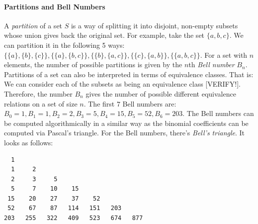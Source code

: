 




% 

\paragraph{Partitions and Bell Numbers}
\label{Sec:PartitionsOfSets}
A \emph{partition} of a set $S$ is a way of splitting it into disjoint, non-empty subsets whose union gives back the original set. For example, take the set $\{a,b,c\}$. We can partition it in the following 5 ways: $\{\{a\},\{b\},\{c\}\}, \{\{a\},\{b,c\}\}, \{\{b\},\{a,c\}\}, \{\{c\},\{a,b\}\}, \{\{a,b,c\}\}$. For a set with $n$ elements, the number of possible partitions is given by the $n$th \emph{Bell number} $B_n$. Partitions of a set can also be interpreted in terms of equivalence classes. That is: We can consider each of the subsets as being an equivalence class [VERIFY!]. Therefore, the number $B_n$ gives the number of possible different equivalence relations on a set of size $n$. The first $7$ Bell numbers are: $B_0=1, B_1=1, B_2=2, B_3=5, B_4=15, B_5=52, B_6=203$. The Bell numbers can be computed algorithmically in a similar way as the binomial coefficients can be computed via Pascal's triangle. For the Bell numbers, there's \emph{Bell's triangle}. It looks as follows:
\begin{center}  %
\begin{verbatim}
  1
  1     2
  2     3     5
  5     7    10    15
 15    20    27    37    52
 52    67    87   114   151   203
203   255   322   409   523   674   877
\end{verbatim}
\end{center}
